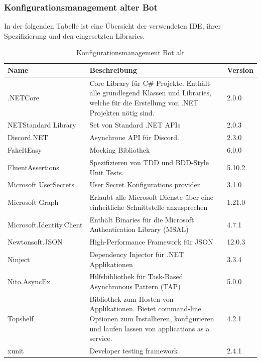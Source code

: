 \documentclass[a4paper, table]{article}
\begin{document}
\subsubsection*{Konfigurationsmanagement alter Bot}
In der folgenden Tabelle ist eine Übersicht der verwendeten IDE, ihrer Spezifizierung und den eingesetzten Libraries.

\begin{table}[h]
    \centering
    \begin{tabular}{|l|p{20em}|l|}
        \hline
        \rowcolor[gray]{.9} Name & Beschreibung & Version \\
        \hline
        .NETCore & Core Library für C\# Projekte.
        Enthält alle grundlegend Klassen und Libraries, welche für die Erstellung von .NET Projekten nötig sind. & 2.0.0 \\
        \hline
        NETStandard Library & Set von Standard .NET \gls{API}s & 2.0.3 \\
        \hline
        Discord.NET & Asynchrone \gls{API} für Discord. & 2.3.0 \\
        \hline
        FakeItEasy & Mocking Bibliothek & 6.0.0 \\
        \hline
        FluentAssertions & Spezifizieren von TDD und BDD-Style Unit Tests. & 5.10.2 \\
        \hline
        Microsoft UserSecrets & User Secret Konfigurations provider & 3.1.0 \\
        \hline
        Microsoft Graph & Erlaubt alle Microsoft Dienste über eine einheitliche Schnittstelle anzusprechen & 1.21.0 \\
        \hline
        Microsoft.Identity.Client & Enthält Binaries für die Microsoft Authentication Library (MSAL) & 4.7.1 \\
        \hline
        Newtonsoft.JSON & High-Performance Framework für \gls{JSON} & 12.0.3 \\
        \hline
        Ninject & Dependency Injector für .NET Applikationen & 3.3.4 \\
        \hline
        Nito.AsyncEx & Hilfsbibliothek für Task-Based Asynchronous Pattern (TAP) & 5.0.0 \\
        \hline
        Topshelf & Bibliothek zum Hosten von Applikationen. 
        Bietet command-line Optionen zum Installieren, konfigurieren und laufen lassen von applications as a service. & 4.2.1 \\
        \hline
        xunit & Developer testing framework & 2.4.1 \\
        \hline
    \end{tabular}
    \caption{Konfigurationsmanagement Bot alt}
    \label{tab: Konfigurationsmanagement-Bot-alt}
\end{table}
\end{document}
